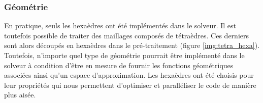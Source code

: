 \subsubsection{Géométrie}
\label{sssect:zones_homogenes_geometrie}

En pratique, seuls les hexaèdres ont été implémentés dans le solveur. Il est toutefois
possible de traiter des maillages composés de tétraèdres. Ces derniers sont alors
découpés en hexaèdres dans le pré-traitement (figure \ref{img:tetra_hexa}). Toutefois, n'importe
quel type de géométrie pourrait être implémenté dans le solveur à condition d'être
en mesure de fournir les fonctions géométriques associées ainsi qu'un espace
d'approximation. Les hexaèdres ont été choisis pour leur propriétés qui nous
permettent d'optimiser et paralléliser le code de manière plus aisée.
\\

